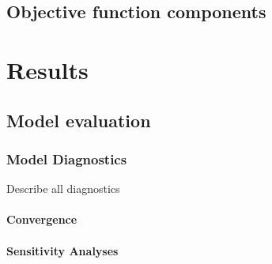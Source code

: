 \documentclass[11pt,
  english,
  a4paper,
]{article}
\begin{document}
\hypertarget{objective-function-components}{%
\subsection{Objective function components}\label{objective-function-components}}

\leavevmode\tagmcend\tagstructend


\hypertarget{results}{%
\section{Results}\label{results}}

\leavevmode\tagmcend\tagstructend


\hypertarget{model-evaluation}{%
\subsection{Model evaluation}\label{model-evaluation}}

\leavevmode\tagmcend\tagstructend


\hypertarget{model-diagnostics}{%
\subsubsection{Model Diagnostics}\label{model-diagnostics}}

\leavevmode\tagmcend\tagstructend


Describe all diagnostics

\leavevmode\tagmcend\tagstructend\par


\hypertarget{convergence}{%
\paragraph{Convergence}\label{convergence}}

\leavevmode\tagmcend\tagstructend


\hypertarget{sensitivity-analyses}{%
\paragraph{Sensitivity Analyses}\label{sensitivity-analyses}}
\end{document}
